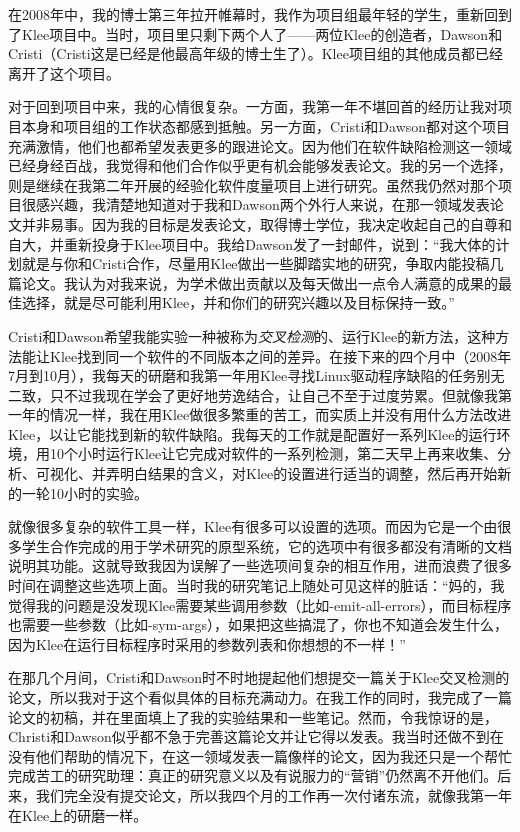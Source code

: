 \documentclass[letter,12pt]{book}
\begin{document}
\begin{CJK}{UTF8}{gbsn}

在2008年中，我的博士第三年拉开帷幕时，我作为项目组最年轻的学生，重新回到了Klee项目中。当时，项目里只剩下两个人了——两位Klee的创造者，Dawson和Cristi（Cristi这是已经是他最高年级的博士生了）。Klee项目组的其他成员都已经离开了这个项目。

对于回到项目中来，我的心情很复杂。一方面，我第一年不堪回首的经历让我对项目本身和项目组的工作状态都感到抵触。另一方面，Cristi和Dawson都对这个项目充满激情，他们也都希望发表更多的跟进论文。因为他们在软件缺陷检测这一领域已经身经百战，我觉得和他们合作似乎更有机会能够发表论文。我的另一个选择，则是继续在我第二年开展的经验化软件度量项目上进行研究。虽然我仍然对那个项目很感兴趣，我清楚地知道对于我和Dawson两个外行人来说，在那一领域发表论文并非易事。因为我的目标是发表论文，取得博士学位，我决定收起自己的自尊和自大，并重新投身于Klee项目中。我给Dawson发了一封邮件，说到：“我大体的计划就是与你和Cristi合作，尽量用Klee做出一些脚踏实地的研究，争取内能投稿几篇论文。我认为对我来说，为学术做出贡献以及每天做出一点令人满意的成果的最佳选择，就是尽可能利用Klee，并和你们的研究兴趣以及目标保持一致。”

\breakline

Cristi和Dawson希望我能实验一种被称为\emph{交叉检测}的、运行Klee的新方法，这种方法能让Klee找到同一个软件的不同版本之间的差异。在接下来的四个月中（2008年7月到10月），我每天的研磨和我第一年用Klee寻找Linux驱动程序缺陷的任务别无二致，只不过我现在学会了更好地劳逸结合，让自己不至于过度劳累。但就像我第一年的情况一样，我在用Klee做很多繁重的苦工，而实质上并没有用什么方法改进Klee，以让它能找到新的软件缺陷。我每天的工作就是配置好一系列Klee的运行环境，用10个小时运行Klee让它完成对软件的一系列检测，第二天早上再来收集、分析、可视化、并弄明白结果的含义，对Klee的设置进行适当的调整，然后再开始新的一轮10小时的实验。

就像很多复杂的软件工具一样，Klee有很多可以设置的选项。而因为它是一个由很多学生合作完成的用于学术研究的原型系统，它的选项中有很多都没有清晰的文档说明其功能。这就导致我因为误解了一些选项间复杂的相互作用，进而浪费了很多时间在调整这些选项上面。当时我的研究笔记上随处可见这样的脏话：“妈的，我觉得我的问题是没发现Klee需要某些调用参数（比如-emit-all-errors），而目标程序也需要一些参数（比如-sym-args），如果把这些搞混了，你也不知道会发生什么，因为Klee在运行目标程序时采用的参数列表和你想想的不一样！”

在那几个月间，Cristi和Dawson时不时地提起他们想提交一篇关于Klee交叉检测的论文，所以我对于这个看似具体的目标充满动力。在我工作的同时，我完成了一篇论文的初稿，并在里面填上了我的实验结果和一些笔记。然而，令我惊讶的是，Christi和Dawson似乎都不急于完善这篇论文并让它得以发表。我当时还做不到在没有他们帮助的情况下，在这一领域发表一篇像样的论文，因为我还只是一个帮忙完成苦工的研究助理：真正的研究意义以及有说服力的“营销”仍然离不开他们。后来，我们完全没有提交论文，所以我四个月的工作再一次付诸东流，就像我第一年在Klee上的研磨一样。


\end{CJK}
\end{document}
